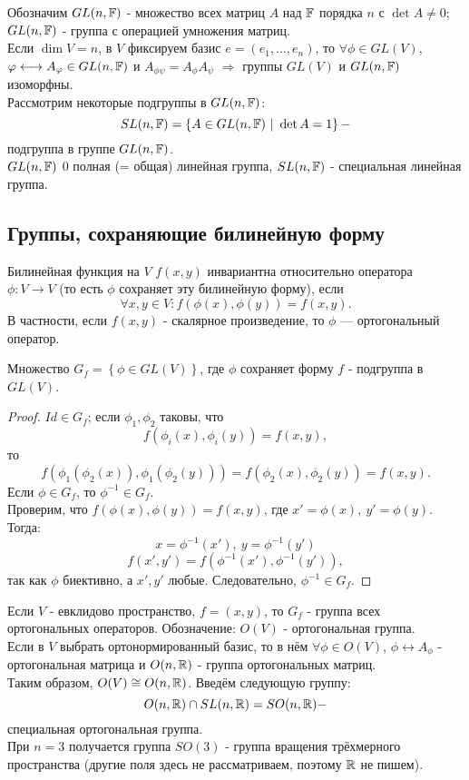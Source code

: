 \begin{example1}
    Обозначим $GL(n, \mathbb{F})$ - множество всех матриц $A$ над $\mathbb{F}$ порядка $n$ с $\det{A} \neq 0$; $GL(n, \mathbb{F})$ - группа с операцией умножения матриц.\\
    Если $\dim{V} = n$, в $V$ фиксируем базис $e = (e_1, \dots, e_n)$, то $\forall \phi \in GL(V)$, $\varphi \longleftrightarrow A_{\varphi} \in GL(n, \mathbb{F})$ и $A_{\phi \psi} = A_{\phi}A_{\psi}$ $\Longrightarrow$ группы $GL(V)$ и $GL(n, \mathbb{F})$ изоморфны.\\
    Рассмотрим некоторые подгруппы в $GL(n, \mathbb{F})$:
    \[SL(n, \mathbb{F}) = \left\{A \in GL(n, \mathbb{F}) \ | \ \det{A} = 1\right\} - \]
    подгруппа  в группе $GL(n, \mathbb{F})$.\\
    $GL(n, \mathbb{F})$ 0 полная (= общая) линейная группа, $SL(n, \mathbb{F})$ - специальная линейная группа.
\end{example1}
\subsection{Группы, сохраняющие билинейную форму}
\begin{definition}
    Билинейная функция на $V$ $f(x,y)$ инвариантна относительно оператора $\phi: V \to V$ (то есть $\phi$ сохраняет эту билинейную форму), если \[\forall x, y \in V: f(\phi(x), \phi(y)) = f(x,y).\]
    В частности, если $f(x,y)$ - скалярное произведение, то $\phi$ — ортогональный оператор.
\end{definition} 
\begin{lemma}
    Множество $G_f = \left\{\phi \in GL(V)\right\}$, где $\phi$ сохраняет форму $f$ - подгруппа в $GL(V)$.
\end{lemma} 
\begin{proof}
    $Id \in G_f$; если $\phi_1, \phi_2$ таковы, что 
    \[f(\phi_i(x), \phi_i(y)) = f(x,y),\]
    то 
    \[f(\phi_1(\phi_2(x)), \phi_1(\phi_2(y))) = f(\phi_2(x), \phi_2(y)) = f(x,y).\]
    Если $\phi \in G_f$, то $\phi^{-1} \in G_f$.\\
    Проверим, что $f(\phi(x), \phi(y)) = f(x,y)$, где $x' = \phi(x), \ y' = \phi(y)$. Тогда: 
    $$x = \phi^{-1}(x'), \ y = \phi^{-1}(y')$$
    \[f(x',y') = f(\phi^{-1}(x'), \phi^{-1}(y')),\]
    так как $\phi$ биективно, а $x',y'$ любые. Следовательно, $\phi^{-1} \in G_f$.
\end{proof} 
Если $V$ - евклидово пространство, $f = (x,y)$, то $G_f$ - группа всех ортогональных операторов. Обозначение: $O(V)$ - ортогональная группа.\\
Если в $V$ выбрать ортонормированный базис, то в нём $\forall \phi \in O(V)$, $\phi \longleftrightarrow A_{\phi}$ - ортогональная матрица и $O(n, \mathbb{R})$ - группа ортогональных матриц.\\
Таким образом, $O(V) \cong O(n, \mathbb{R})$. Введём следующую группу:
\[O(n, \mathbb{R}) \cap SL(n, \mathbb{R}) = SO(n, \mathbb{R}) - \]
специальная ортогональная группа.\\
При $n = 3$ получается группа $SO(3)$ - группа вращения трёхмерного пространства (другие поля здесь не рассматриваем, поэтому $\mathbb{R}$ не пишем).
